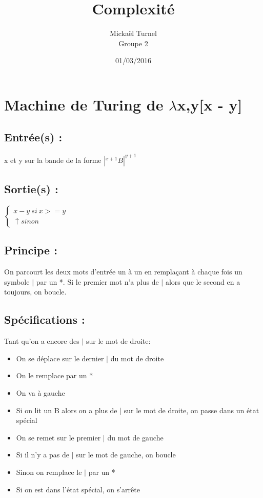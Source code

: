 \documentclass{report}
\title{Complexité}
\author{Mickaël Turnel\\Groupe 2}
\date{01/03/2016}
\begin{document}
\maketitle

\section*{Machine de Turing de $\lambda$x,y[x - y]}

\subsection*{Entrée(s) :}

x et y sur la bande de la forme $|^{x+1}B|^{y+1}$

\subsection*{Sortie(s) :}

$\left\{
	\begin{array}{ll}
		x-y ~ si ~ x >= y\\
		\uparrow sinon
	\end{array}
\right.$

\subsection*{Principe :}

On parcourt les deux mots d'entrée un à un en remplaçant à chaque fois un symbole $|$ par un *.
Si le premier mot n'a plus de $|$ alors que le second en a toujours, on boucle.

\subsection*{Spécifications :}

Tant qu'on a encore des $|$ sur le mot de droite:
	\begin{itemize}
		\item On se déplace sur le dernier $|$ du mot de droite
		\item On le remplace par un *
		\item On va à gauche
		\item Si on lit un B alors on a plus de $|$ sur le mot de droite, on passe dans un état spécial
		\item On se remet sur le premier $|$ du mot de gauche
		\item Si il n'y a pas de $|$ sur le mot de gauche, on boucle
		\item Sinon on remplace le $|$ par un *
		\item Si on est dans l'état spécial, on s'arrête
	\end{itemize}
\end{document}
